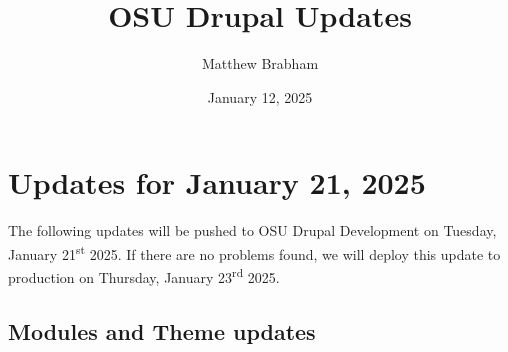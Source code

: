 
\title{OSU Drupal Updates}
\author{Matthew Brabham}
\date{January 12, 2025}

    \maketitle
    \tableofcontents


    \section{Updates for January 21, 2025}
    The following updates will be pushed to OSU Drupal Development on Tuesday, January 21\textsuperscript{st} 2025.
    If there are no problems found, we will deploy this update to production on Thursday, January 23\textsuperscript{rd} 2025.

    \subsection{Modules and Theme updates}

